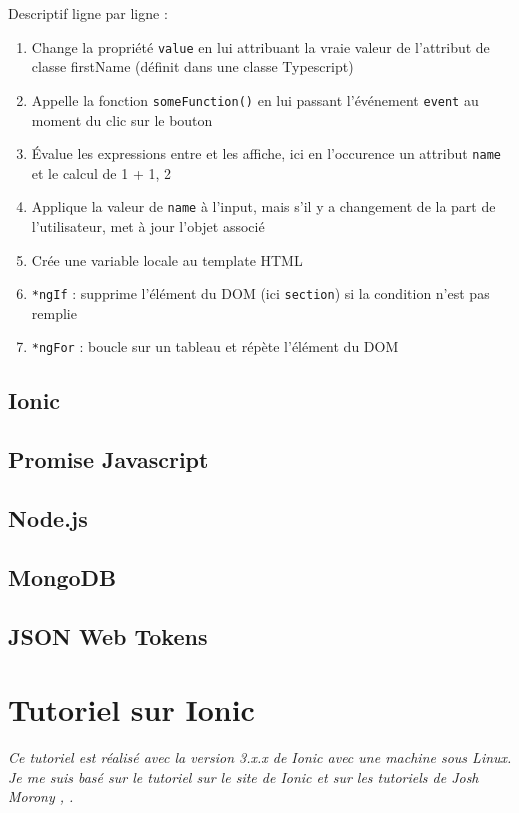 \documentclass[a4paper, 12pt]{article}
\begin{document}
Descriptif ligne par ligne :
\begin{enumerate}
    \item Change la propriété \texttt{value} en lui attribuant la vraie valeur de l'attribut de classe firstName (définit dans une classe Typescript)
    \item Appelle la fonction \texttt{someFunction()} en lui passant l'événement \texttt{event} au moment du clic sur le bouton
    \item Évalue les expressions entre {} et les affiche, ici en l'occurence un attribut \texttt{name} et le calcul de 1 + 1, 2
    \item Applique la valeur de \texttt{name} à l'input, mais s'il y a changement de la part de l'utilisateur, met à jour l'objet associé
    \item Crée une variable locale au template HTML
    \item \texttt{*ngIf} : supprime l'élément du DOM (ici \texttt{section}) si la condition n'est pas remplie
    \item \texttt{*ngFor} : boucle sur un tableau et répète l'élément du DOM
\end{enumerate}
\subsection{Ionic}
\subsection{Promise Javascript}
\subsection{Node.js}
\subsection{MongoDB}
\subsection{JSON Web Tokens}

\section{Tutoriel sur Ionic}
\textit{Ce tutoriel est réalisé avec la version 3.x.x de Ionic avec une machine sous Linux. Je me suis basé sur  
le tutoriel sur le site de Ionic \cite{ref0} et sur les tutoriels de Josh Morony \cite{ref10}, \cite{ref20}.}
\end{document}
